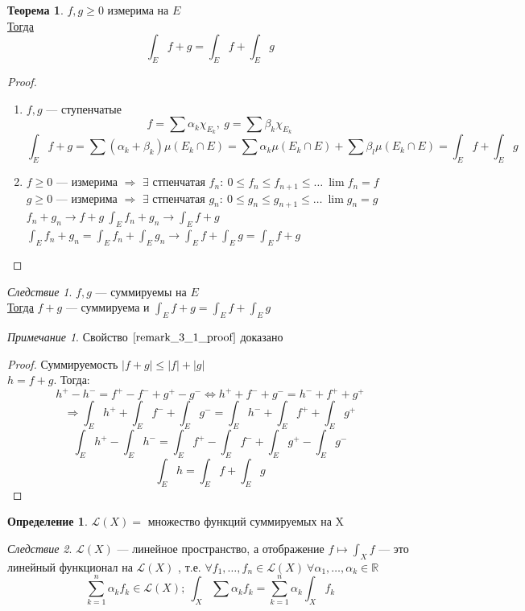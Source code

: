 \documentclass[russ,oneside]{book}
\newcommand{\R}{\mathbb{R}}
\theoremstyle{plain}
\theoremstyle{remark}
\newtheorem*{remark}{Примечание}
\newtheorem{corollary}{Следствие}[theorem]
\theoremstyle{definition}
\newtheorem{theorem}{Теорема}[section]
\newtheorem*{definition}{Определение}
\begin{document}
\begin{theorem}
\(f, g \ge 0\) измерима на \(E\) \\
\uline{Тогда} \[ \int_E f + g = \int_E f + \int_E g \]
\end{theorem}
\begin{proof}
\-
\begin{enumerate}
\item \(f, g\) --- ступенчатые \\
\[ f = \sum \alpha_k\chi_{E_k},\ g = \sum \beta_k\chi_{E_k} \]
\[ \int_E f + g = \sum (\alpha_k + \beta_k)\mu(E_k \cap E) = \sum \alpha_k \mu(E_k \cap E) + \sum \beta_l \mu(E_k \cap E) = \int_E f + \int_E g \]
\item \(f \ge 0\) --- измерима \(\Rightarrow\) \(\exists\) стпенчатая \(f_n:\ 0 \le f_n \le f_{n + 1} \le \dots \ \lim f_n = f\) \\
\(g \ge 0\) --- измерима \(\Rightarrow\) \(\exists\) стпенчатая \(g_n:\ 0 \le g_n \le g_{n + 1} \le \dots \ \lim g_n = g\) \\
\(f_n + g_n \to f + g\ \int_E f_n + g_n \to \int_E f + g\) \\
\(\int_E f_n + g_n = \int_E f_n + \int_E g_n \to \int_E f + \int_E g = \int_E f+g\)
\end{enumerate}
\end{proof}
\begin{corollary}
\(f, g\) --- суммируемы на \(E\) \\
\uline{Тогда} \(f+g\) --- суммируема и \(\int_E f + g = \int_E f + \int_E g\)
\end{corollary}
\begin{remark}
Свойство \(\ref{remark_3_1_proof}\) доказано
\end{remark}
\begin{proof}
Суммируемость \(|f+g|\le |f| + |g|\) \\
\(h = f + g\). Тогда:
\[ h^+ - h^- = f^+ - f^- + g^+ - g^- \Leftrightarrow h^+ + f^- + g^- = h^- + f^+ + g^+ \]
\[ \Rightarrow \int_E h^+ + \int_E f^- + \int_E g^- = \int_E h^- + \int_E f^+ + \int_E g^+ \]
\[ \int_E h^+ - \int_E h^- = \int_E f^+ - \int_E f^- + \int_E g^+ - \int_E g^- \]
\[ \int_E h = \int_E f + \int_E g \]
\end{proof}
\begin{definition}
\(\mathcal{L}(X) =\) множество функций суммируемых на X
\end{definition}
\begin{corollary}
\(\mathcal{L}(X)\) --- линейное пространство, а отображение \(f \mapsto \int_X f\) --- это линейный функционал на \(\mathcal{L}(X)\)
, т.е. \(\forall f_1, \dots, f_n \in \mathcal{L}(X)\ \forall \alpha_1, \dots, \alpha_k \in \R\)
\[ \sum_{k = 1}^n \alpha_k f_k \in \mathcal{L}(X);\ \int_X\sum\alpha_k f_k = \sum_{k = 1}^n\alpha_k\int_X f_k\]
\end{corollary}
\end{document}
